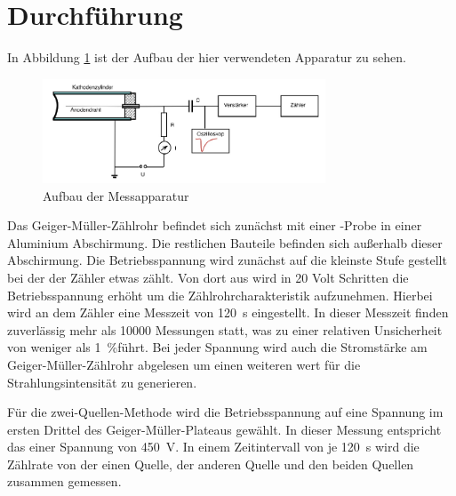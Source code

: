 \section{Durchführung}
In Abbildung \ref{fig:01_teo} ist der Aufbau der hier verwendeten Apparatur zu sehen.
\begin{figure}
    \centering
    \includegraphics[width = 0.75\textwidth]{14_v703/Abbildungen/Seite 2.pdf}
    \caption{Aufbau der Messapparatur \cite{man:v703}}
    \label{fig:01_teo}
\end{figure}
Das Geiger-Müller-Zählrohr befindet sich zunächst mit einer -Probe in einer Aluminium Abschirmung.
Die restlichen Bauteile befinden sich außerhalb dieser Abschirmung.
Die Betriebsspannung wird zunächst auf die kleinste Stufe gestellt bei der der Zähler etwas zählt.
Von dort aus wird in 20 Volt Schritten die Betriebsspannung erhöht um die Zählrohrcharakteristik aufzunehmen.
Hierbei wird an dem Zähler eine Messzeit von \qty{120}{\s} eingestellt.
In dieser Messzeit finden zuverlässig mehr als \num{10000} Messungen statt, was zu einer relativen Unsicherheit von weniger als \qty{1}{\percent}führt.
Bei jeder Spannung wird auch die Stromstärke am Geiger-Müller-Zählrohr abgelesen um einen weiteren wert für die Strahlungsintensität zu generieren.

Für die zwei-Quellen-Methode wird die Betriebsspannung auf eine Spannung im ersten Drittel des Geiger-Müller-Plateaus gewählt.
In dieser Messung entspricht das einer Spannung von \qty{450}{\volt}.
In einem Zeitintervall von je \qty{120}{\s} wird die Zählrate von der einen Quelle, der anderen Quelle und den beiden Quellen zusammen gemessen.